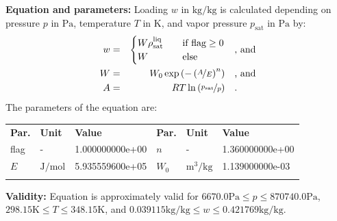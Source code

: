 \textbf{Equation and parameters:}
\newline
%
Loading $w$ in $\si{\kilogram\per\kilogram}$ is calculated depending on pressure $p$ in $\si{\pascal}$, temperature $T$ in $\si{\kelvin}$, and vapor pressure $p_\mathrm{sat}$ in $\si{\pascal}$ by:
%
\begin{equation*}
\begin{split}
w &=& \begin{cases} W \rho_\mathrm{sat}^{\mathrm{liq}} & \quad \text{if flag} \geq 0 \\ W & \quad \text{else} \end{cases} & \quad\text{, and} \\
W &=& W_0 \exp \left( - \left( \nicefrac{A}{E} \right) ^{n} \right) & \quad\text{, and} \\
A &=& R T \ln \left( \nicefrac{p_\mathrm{sat}}{p} \right) & \quad\text{.} \\
\end{split}
\end{equation*}
%
The parameters of the equation are:
%
\begin{longtable}[l]{lll|lll}
\toprule
\addlinespace
\textbf{Par.} & \textbf{Unit} & \textbf{Value} &	\textbf{Par.} & \textbf{Unit} & \textbf{Value} \\
\addlinespace
\midrule
\endhead

\bottomrule
\endfoot
\bottomrule
\endlastfoot
\addlinespace

flag & - & 1.000000000e+00 & $n$ & - & 1.360000000e+00 \\
$E$ & $\si{\joule\per\mole}$ & 5.935559600e+05 & $W_0$ & $\si{\cubic\meter\per\kilogram}$ & 1.139000000e-03 \\

\addlinespace\end{longtable}

\textbf{Validity:}
\newline
Equation is approximately valid for $6670.0 \si{\pascal} \leq p \leq 870740.0 \si{\pascal}$,  $298.15 \si{\kelvin} \leq T \leq 348.15 \si{\kelvin}$, and $0.039115 \si{\kilogram\per\kilogram} \leq w \leq 0.421769 \si{\kilogram\per\kilogram}$.
\newline

